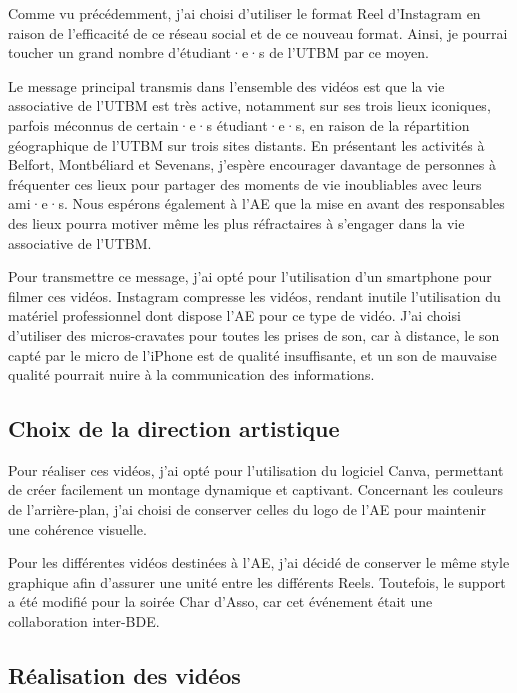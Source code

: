 Comme vu précédemment, j'ai choisi d'utiliser le format Reel d'Instagram en raison de l'efficacité de ce réseau social et de ce nouveau format.
Ainsi, je pourrai toucher un grand nombre d'étudiant·e·s de l'\gls{UTBM} par ce moyen.

Le message principal transmis dans l'ensemble des vidéos est que la vie associative de l'\gls{UTBM} est très active, notamment sur ses trois lieux iconiques, parfois méconnus de certain·e·s étudiant·e·s, en raison de la répartition géographique de l'\gls{UTBM} sur trois sites distants.
En présentant les activités à Belfort, Montbéliard et Sevenans, j'espère encourager davantage de personnes à fréquenter ces lieux pour partager des moments de vie inoubliables avec leurs ami·e·s.
Nous espérons également à l'\gls{AE} que la mise en avant des responsables des lieux pourra motiver même les plus réfractaires à s'engager dans la vie associative de l'\gls{UTBM}.

Pour transmettre ce message, j'ai opté pour l'utilisation d'un smartphone pour filmer ces vidéos.
Instagram compresse les vidéos, rendant inutile l'utilisation du matériel professionnel dont dispose l'\gls{AE} pour ce type de vidéo.
J'ai choisi d'utiliser des micros-cravates pour toutes les prises de son, car à distance, le son capté par le micro de l'iPhone est de qualité insuffisante, et un son de mauvaise qualité pourrait nuire à la communication des informations.


\subsection{Choix de la direction artistique}\label{subsec:choix-de-la-direction-artistique}

Pour réaliser ces vidéos, j'ai opté pour l'utilisation du logiciel Canva, permettant de créer facilement un montage dynamique et captivant.
Concernant les couleurs de l'arrière-plan, j'ai choisi de conserver celles du logo de l'\gls{AE} pour maintenir une cohérence visuelle.

Pour les différentes vidéos destinées à l'\gls{AE}, j'ai décidé de conserver le même style graphique afin d'assurer une unité entre les différents Reels.
Toutefois, le support a été modifié pour la soirée Char d'Asso, car cet événement était une collaboration inter-BDE.


\subsection{Réalisation des vidéos}\label{subsec:realisation-des-videos}


